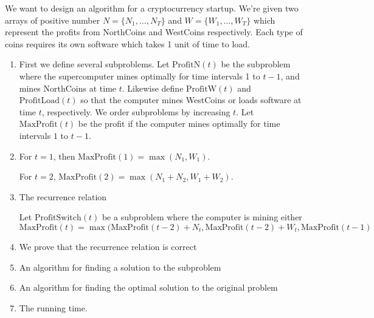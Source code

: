 \documentclass[11pt]{article}
\newcommand{\maxp}{\textrm{MaxProfit}}
\begin{document}
We want to design an algorithm for a cryptocurrency startup. We're given two arrays of positive number $N=\{N_1, \dots, N_T\}$ and $W=\{W_1, \dots, W_T\}$ which represent the profits from NorthCoins and WestCoins respectively. Each type of coins requires its own software which takes 1 unit of time to load. 
\begin{enumerate}
\item First we define several subproblems. Let $\textrm{ProfitN}(t)$ be the subproblem where the supercomputer mines optimally for time intervals 1 to $t-1$, and mines NorthCoins at time $t$. Likewise define $\textrm{ProfitW}(t)$ and $\textrm{ProfitLoad}(t)$ so that the computer mines WestCoins or loads software at time $t$, respectively. We order subproblems by increasing $t$. Let $\textrm{MaxProfit}(t)$ be the profit if the computer mines optimally for time intervals $1$ to $t-1$. 
\item For $t=1$, then $\textrm{MaxProfit}(1) = \max(N_1, W_1)$. 

For $t=2$, $\textrm{MaxProfit}(2) = \max(N_1+N_2, W_1+W_2)$. 
\item The recurrence relation

Let $\textrm{ProfitSwitch}(t)$ be a subproblem where the computer is mining either 
\[ \textrm{MaxProfit}(t) = \max(\textrm{MaxProfit}(t-2)+N_t, \maxp(t-2)+W_t, \maxp(t-1)\]
\item We prove that the recurrence relation is correct
\item An algorithm for finding a solution to the subproblem
\item An algorithm for finding the optimal solution to the original problem
\item The running time. 
\end{enumerate}
\end{document}
